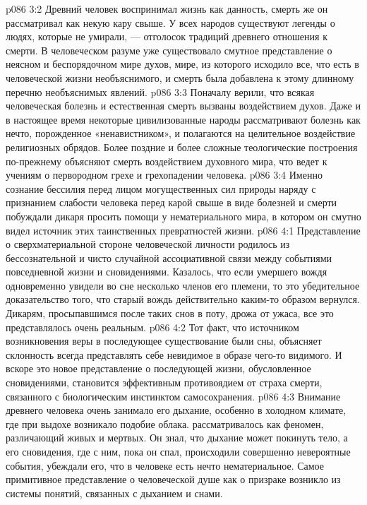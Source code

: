 \vs p086 3:2 \pc Древний человек воспринимал жизнь как данность, смерть же он рассматривал как некую кару свыше. У всех народов существуют легенды о людях, которые не умирали, --- отголосок традиций древнего отношения к смерти. В человеческом разуме уже существовало смутное представление о неясном и беспорядочном мире духов, мире, из которого исходило все, что есть в человеческой жизни необъяснимого, и смерть была добавлена к этому длинному перечню необъяснимых явлений.
\vs p086 3:3 Поначалу верили, что всякая человеческая болезнь и естественная смерть вызваны воздействием духов. Даже и в настоящее время некоторые цивилизованные народы рассматривают болезнь как нечто, порожденное «ненавистником», и полагаются на целительное воздействие религиозных обрядов. Более поздние и более сложные теологические построения по\hyp{}прежнему объясняют смерть воздействием духовного мира, что ведет к учениям о первородном грехе и грехопадении человека.
\vs p086 3:4 Именно сознание бессилия перед лицом могущественных сил природы наряду с признанием слабости человека перед карой свыше в виде болезней и смерти побуждали дикаря просить помощи у нематериального мира, в котором он смутно видел источник этих таинственных превратностей жизни.
\vs p086 4:1 Представление о сверхматериальной стороне человеческой личности родилось из бессознательной и чисто случайной ассоциативной связи между событиями повседневной жизни и сновидениями. Казалось, что если умершего вождя одновременно увидели во сне несколько членов его племени, то это убедительное доказательство того, что старый вождь действительно каким\hyp{}то образом вернулся. Дикарям, просыпавшимся после таких снов в поту, дрожа от ужаса, все это представлялось очень реальным.
\vs p086 4:2 Тот факт, что источником возникновения веры в последующее существование были сны, объясняет склонность всегда представлять себе невидимое в образе чего\hyp{}то видимого. И вскоре это новое представление о последующей жизни, обусловленное сновидениями, становится эффективным противоядием от страха смерти, связанного с биологическим инстинктом самосохранения.
\vs p086 4:3 Внимание древнего человека очень занимало его дыхание, особенно в холодном климате, где при выдохе возникало подобие облака.  рассматривалось как феномен, различающий живых и мертвых. Он знал, что дыхание может покинуть тело, а его сновидения, где с ним, пока он спал, происходили совершенно невероятные события, убеждали его, что в человеке есть нечто нематериальное. Самое примитивное представление о человеческой душе как о призраке возникло из системы понятий, связанных с дыханием и снами.
